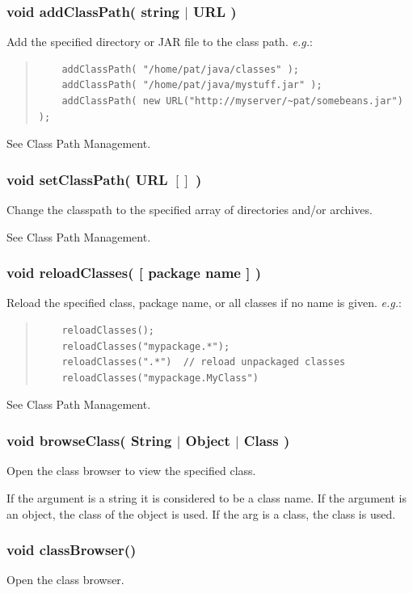 \documentclass[twoside,11pt]{article}
\renewcommand{\_}{\texttt{\symbol{95}}}
\newcommand{\eg}{\textit{e.g.}}
\begin{document}
\subsubsection*{void addClassPath( string $|$ URL )}
Add the specified directory or JAR file to the class path. \eg:
\begin{quote}
\begin{verbatim}
    addClassPath( "/home/pat/java/classes" );
    addClassPath( "/home/pat/java/mystuff.jar" );
    addClassPath( new URL("http://myserver/~pat/somebeans.jar") );
\end{verbatim}
\end{quote}
See Class Path Management.

\subsubsection*{void setClassPath( URL $[]$ )}
Change the classpath to the specified array of directories and/or archives.

See Class Path Management.

\subsubsection*{void reloadClasses( [ package name ] )}
Reload the specified class, package name, or all classes if no name is
given. \eg:
\begin{quote}
\begin{verbatim}
    reloadClasses();
    reloadClasses("mypackage.*");
    reloadClasses(".*")  // reload unpackaged classes
    reloadClasses("mypackage.MyClass")
\end{verbatim}
\end{quote}

See Class Path Management.

\subsubsection*{void browseClass( String $|$ Object $|$ Class )}
Open the class browser to view the specified class.

If the argument is a string it is considered to be a class name.
If the argument is an object, the class of the object is used.
If the arg is a class, the class is used.

\subsubsection*{void classBrowser()}
Open the class browser.
\end{document}
